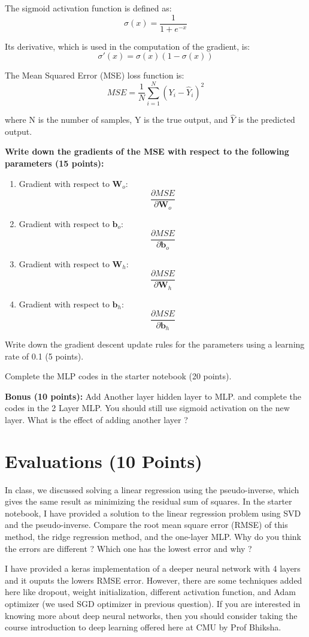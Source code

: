\documentclass{article}
\begin{document}
The sigmoid activation function is defined as:
\[
\sigma(x) = \frac{1}{1 + e^{-x}}
\]

Its derivative, which is used in the computation of the gradient, is:
\[
\sigma'(x) = \sigma(x)(1 - \sigma(x))
\]

The Mean Squared Error (MSE) loss function is:
\[
MSE = \frac{1}{N} \sum_{i=1}^{N} (Y_i - \hat{Y}_i)^2
\]

where N is the number of samples, Y is the true output, and \(\hat{Y}\) is the predicted output.

\textbf{Write down the gradients of the MSE with respect to the following parameters (15 points):}
\begin{enumerate}
    \item Gradient with respect to $\mathbf{W}_o$: $$\frac{\partial MSE}{\partial \mathbf{W}_o}$$
    \item Gradient with respect to $\mathbf{b}_o$: $$\frac{\partial MSE}{\partial \mathbf{b}_o}$$
    \item Gradient with respect to $\mathbf{W}_h$: $$\frac{\partial MSE}{\partial \mathbf{W}_h}$$
    \item Gradient with respect to $\mathbf{b}_h$: $$\frac{\partial MSE}{\partial \mathbf{b}_h}$$
\end{enumerate}

Write down the gradient descent update rules for the parameters using a learning rate of 0.1 (5 points).

Complete the MLP codes in the starter notebook (20 points).

\textbf{Bonus (10 points):} Add Another layer hidden layer to MLP. and complete the codes in the 2 Layer MLP.
You should still use sigmoid activation on the new layer. What is the effect of adding another layer ?

\section{Evaluations (10 Points)}
In class, we discussed solving a linear regression using the pseudo-inverse, which gives the same result as minimizing the residual sum of squares. In the starter notebook, I have provided a solution to the linear regression problem using SVD and the pseudo-inverse. Compare the root mean square error (RMSE) of this method, the ridge regression method, and the one-layer MLP. Why do you think the errors are different ?
Which one has the lowest error and why ?

I have provided a keras implementation of a deeper neural network with 4 layers and it ouputs the lowers
RMSE error. However, there are some techniques added here like dropout, weight initialization, different
activation function, and Adam optimizer (we used SGD optimizer in previous question). If you are interested
in knowing more about deep neural networks, then you should consider taking the course introduction to
deep learning offered here at CMU by Prof Bhiksha.
\end{document}

